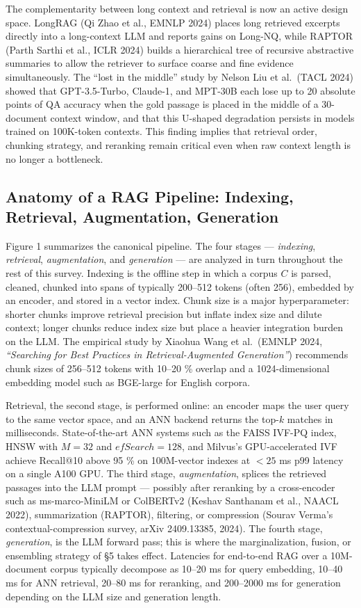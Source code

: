 \documentclass{article}
\begin{document}
The complementarity between long context and retrieval is now an active design space. LongRAG (Qi Zhao et al., EMNLP 2024) places long retrieved excerpts directly into a long-context LLM and reports gains on Long-NQ, while RAPTOR (Parth Sarthi et al., ICLR 2024) builds a hierarchical tree of recursive abstractive summaries to allow the retriever to surface coarse and fine evidence simultaneously. The ``lost in the middle'' study by Nelson Liu et al.~(TACL 2024) showed that GPT-3.5-Turbo, Claude-1, and MPT-30B each lose up to 20 absolute points of QA accuracy when the gold passage is placed in the middle of a 30-document context window, and that this U-shaped degradation persists in models trained on 100K-token contexts. This finding implies that retrieval order, chunking strategy, and reranking remain critical even when raw context length is no longer a bottleneck.

\subsection{Anatomy of a RAG Pipeline: Indexing, Retrieval, Augmentation, Generation}\label{anatomy-of-a-rag-pipeline-indexing-retrieval-augmentation-generation}

Figure 1 summarizes the canonical pipeline. The four stages --- \emph{indexing}, \emph{retrieval}, \emph{augmentation}, and \emph{generation} --- are analyzed in turn throughout the rest of this survey. Indexing is the offline step in which a corpus \(C\) is parsed, cleaned, chunked into spans of typically 200--512 tokens (often 256), embedded by an encoder, and stored in a vector index. Chunk size is a major hyperparameter: shorter chunks improve retrieval precision but inflate index size and dilute context; longer chunks reduce index size but place a heavier integration burden on the LLM. The empirical study by Xiaohua Wang et al.~(EMNLP 2024, \emph{``Searching for Best Practices in Retrieval-Augmented Generation''}) recommends chunk sizes of 256--512 tokens with 10--20 \% overlap and a 1024-dimensional embedding model such as BGE-large for English corpora.

Retrieval, the second stage, is performed online: an encoder maps the user query to the same vector space, and an ANN backend returns the top-\(k\) matches in milliseconds. State-of-the-art ANN systems such as the FAISS IVF-PQ index, HNSW with \(M=32\) and \(efSearch=128\), and Milvus's GPU-accelerated IVF achieve Recall@10 above 95 \% on 100M-vector indexes at \(<25\) ms p99 latency on a single A100 GPU. The third stage, \emph{augmentation}, splices the retrieved passages into the LLM prompt --- possibly after reranking by a cross-encoder such as ms-marco-MiniLM or ColBERTv2 (Keshav Santhanam et al., NAACL 2022), summarization (RAPTOR), filtering, or compression (Sourav Verma's contextual-compression survey, arXiv 2409.13385, 2024). The fourth stage, \emph{generation}, is the LLM forward pass; this is where the marginalization, fusion, or ensembling strategy of §5 takes effect. Latencies for end-to-end RAG over a 10M-document corpus typically decompose as 10--20 ms for query embedding, 10--40 ms for ANN retrieval, 20--80 ms for reranking, and 200--2000 ms for generation depending on the LLM size and generation length.
\end{document}
